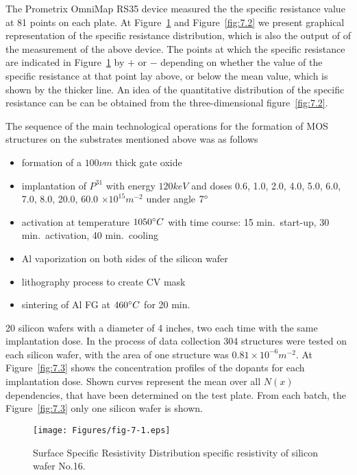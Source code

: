 The Prometrix OmniMap RS35 device measured the the specific resistance
value at 81 points on each plate. At Figure~\ref{fig:7.1} and
Figure~\ref{fig:7.2} we present graphical representation of the
specific resistance distribution, which is also the output of of the
measurement of the above device. The points at which the specific
resistance are indicated in Figure~\ref{fig:7.1} by $+$ or $-$
depending on whether the value of the specific resistance at that
point lay above, or below the mean value, which is shown by the
thicker line.  An idea of the quantitative distribution of the
specific resistance can be can be obtained from the three-dimensional
figure~\ref{fig:7.2}.

The sequence of the main technological operations for the formation of
MOS structures on the substrates mentioned above was as follows

\begin{itemize}
\item formation of a $100 \nu m$ thick gate oxide
\item implantation of $P^{31}$ with energy $120 keV$ and doses 0.6,
  1.0, 2.0, 4.0, 5.0, 6.0, 7.0, 8.0, 20.0, 60.0 $\times 10^{15}
  m^{-2}$ under angle $7\degree$
\item activation at temperature $1050 \degree C$ with time course: 15
  min.\ start-up, 30 min.\ activation, 40 min.\ cooling
\item Al vaporization on both sides of the silicon wafer
\item lithography process to create CV mask
\item sintering of Al FG at $460 \degree C$ for 20 min.
\end{itemize}

20 silicon wafers with a diameter of 4 inches, two each time with the
same implantation dose. In the process of data collection 304
structures were tested on each silicon wafer, with the area of one
structure was $0.81 \times 10^{-6} m^{-2}$. At Figure~\ref{fig:7.3}
shows the concentration profiles of the dopants for each implantation
dose. Shown curves represent the mean over all $N(x)$ dependencies,
that have been determined on the test plate. From each batch, the
Figure~\ref{fig:7.3} only one silicon wafer is shown.

\newpage
\begin{figure}[h!]\centering
  \begin{minipage}[c]{\myfiguresize}
    \begin{center}
      \texttt{[image: Figures/fig-7-1.eps]}%
    \end{center}
  \caption[Area distribution of surface specific resistance of silicon
    wafer No.16]{Surface Specific Resistivity Distribution specific
    resistivity of silicon wafer No.16.}\label{fig:7.1}
  \end{minipage}
\end{figure}

